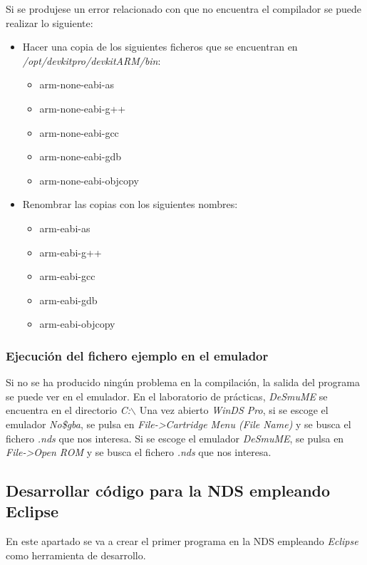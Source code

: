 Si se produjese un error relacionado con que no encuentra el compilador se puede realizar lo siguiente:
\begin{itemize}
\item Hacer una copia de los siguientes ficheros que se encuentran en \textit{/opt/devkitpro/devkitARM/bin}:	
	\begin{itemize}
 	\item arm-none-eabi-as
 	\item arm-none-eabi-g++
 	\item arm-none-eabi-gcc	
 	\item arm-none-eabi-gdb
    \item arm-none-eabi-objcopy
	\end{itemize}
\item Renombrar las copias con los siguientes nombres:	
	\begin{itemize}
 	\item arm-eabi-as
 	\item arm-eabi-g++
 	\item arm-eabi-gcc	
 	\item arm-eabi-gdb
    \item arm-eabi-objcopy
    \end{itemize}
\end{itemize}

\subsubsection{Ejecución del fichero ejemplo en el emulador}
Si no se ha producido ningún problema en la compilación, la salida del programa se puede ver en el emulador. 
En el laboratorio de prácticas, \textit{DeSmuME} se encuentra en el directorio \textit{C:$\backslash$} Una vez abierto \textit{WinDS Pro}, si se escoge el emulador \textit{No\$gba}, se pulsa en \textit{File->Cartridge Menu (File Name)} y se busca el fichero \textit{.nds} que nos interesa. Si se escoge el emulador \textit{DeSmuME}, se pulsa en \textit{File->Open ROM} y se busca el fichero \textit{.nds} que nos interesa.


\subsection{Desarrollar código para la NDS empleando Eclipse}
En este apartado se va a crear el primer programa en la NDS empleando \textit{Eclipse} como herramienta de desarrollo.

